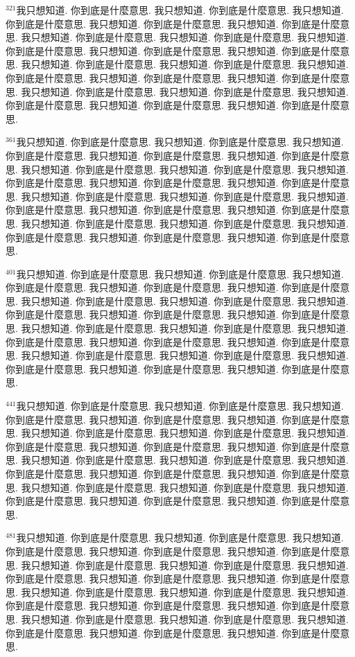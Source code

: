 \documentclass{book}
\begin{document}
$^{321}$我只想知道.
你到底是什麼意思.
我只想知道.
你到底是什麼意思.
我只想知道.
你到底是什麼意思.
我只想知道.
你到底是什麼意思.
我只想知道.
你到底是什麼意思.
我只想知道.
你到底是什麼意思.
我只想知道.
你到底是什麼意思.
我只想知道.
你到底是什麼意思.
我只想知道.
你到底是什麼意思.
我只想知道.
你到底是什麼意思.
我只想知道.
你到底是什麼意思.
我只想知道.
你到底是什麼意思.
我只想知道.
你到底是什麼意思.
我只想知道.
你到底是什麼意思.
我只想知道.
你到底是什麼意思.
我只想知道.
你到底是什麼意思.
我只想知道.
你到底是什麼意思.
我只想知道.
你到底是什麼意思.
我只想知道.
你到底是什麼意思.
我只想知道.
你到底是什麼意思.

$^{361}$我只想知道.
你到底是什麼意思.
我只想知道.
你到底是什麼意思.
我只想知道.
你到底是什麼意思.
我只想知道.
你到底是什麼意思.
我只想知道.
你到底是什麼意思.
我只想知道.
你到底是什麼意思.
我只想知道.
你到底是什麼意思.
我只想知道.
你到底是什麼意思.
我只想知道.
你到底是什麼意思.
我只想知道.
你到底是什麼意思.
我只想知道.
你到底是什麼意思.
我只想知道.
你到底是什麼意思.
我只想知道.
你到底是什麼意思.
我只想知道.
你到底是什麼意思.
我只想知道.
你到底是什麼意思.
我只想知道.
你到底是什麼意思.
我只想知道.
你到底是什麼意思.
我只想知道.
你到底是什麼意思.
我只想知道.
你到底是什麼意思.
我只想知道.
你到底是什麼意思.

$^{401}$我只想知道.
你到底是什麼意思.
我只想知道.
你到底是什麼意思.
我只想知道.
你到底是什麼意思.
我只想知道.
你到底是什麼意思.
我只想知道.
你到底是什麼意思.
我只想知道.
你到底是什麼意思.
我只想知道.
你到底是什麼意思.
我只想知道.
你到底是什麼意思.
我只想知道.
你到底是什麼意思.
我只想知道.
你到底是什麼意思.
我只想知道.
你到底是什麼意思.
我只想知道.
你到底是什麼意思.
我只想知道.
你到底是什麼意思.
我只想知道.
你到底是什麼意思.
我只想知道.
你到底是什麼意思.
我只想知道.
你到底是什麼意思.
我只想知道.
你到底是什麼意思.
我只想知道.
你到底是什麼意思.
我只想知道.
你到底是什麼意思.
我只想知道.
你到底是什麼意思.

$^{441}$我只想知道.
你到底是什麼意思.
我只想知道.
你到底是什麼意思.
我只想知道.
你到底是什麼意思.
我只想知道.
你到底是什麼意思.
我只想知道.
你到底是什麼意思.
我只想知道.
你到底是什麼意思.
我只想知道.
你到底是什麼意思.
我只想知道.
你到底是什麼意思.
我只想知道.
你到底是什麼意思.
我只想知道.
你到底是什麼意思.
我只想知道.
你到底是什麼意思.
我只想知道.
你到底是什麼意思.
我只想知道.
你到底是什麼意思.
我只想知道.
你到底是什麼意思.
我只想知道.
你到底是什麼意思.
我只想知道.
你到底是什麼意思.
我只想知道.
你到底是什麼意思.
我只想知道.
你到底是什麼意思.
我只想知道.
你到底是什麼意思.
我只想知道.
你到底是什麼意思.

$^{481}$我只想知道.
你到底是什麼意思.
我只想知道.
你到底是什麼意思.
我只想知道.
你到底是什麼意思.
我只想知道.
你到底是什麼意思.
我只想知道.
你到底是什麼意思.
我只想知道.
你到底是什麼意思.
我只想知道.
你到底是什麼意思.
我只想知道.
你到底是什麼意思.
我只想知道.
你到底是什麼意思.
我只想知道.
你到底是什麼意思.
我只想知道.
你到底是什麼意思.
我只想知道.
你到底是什麼意思.
我只想知道.
你到底是什麼意思.
我只想知道.
你到底是什麼意思.
我只想知道.
你到底是什麼意思.
我只想知道.
你到底是什麼意思.
我只想知道.
你到底是什麼意思.
我只想知道.
你到底是什麼意思.
我只想知道.
你到底是什麼意思.
我只想知道.
你到底是什麼意思.
\end{document}

